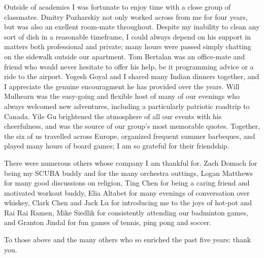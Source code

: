 Outside of academics I was fortunate to enjoy time with a close group of classmates. Dmitry Pozharskiy not only worked across from me for four years, but was also an exellent room-mate throughout. Despite my inability to clean any sort of dish in a reasonable timeframe, I could always depend on his support in matters both professional and private; many hours were passed simply chatting on the sidewalk outside our apartment. Tom Bertalan was an office-mate and friend who would never hesitate to offer his help, be it programming advice or a ride to the airport. Yogesh Goyal and I shared many Indian dinners together, and I appreciate the genuine encouragment he has provided over the years. Will Mulhearn was the easy-going and flexible host of many of our evenings who always welcomed new adventures, including a particularly patriotic roadtrip to Canada. Yile Gu brightened the atmosphere of all our events with his cheerfulness, and was the source of our group's most memorable quotes. Together, the six of us travelled across Europe, organized frequent summer barbeques, and played many hours of board games; I am so grateful for their friendship.

There were numerous others whose company I am thankful for. Zach Domach for being my SCUBA buddy and for the many orchestra outtings, Logan Matthews for many good discussions on religion, Ting Chen for being a caring friend and motivated workout buddy, Elia Altabet for many evenings of conversation over whiskey, Clark Chen and Jack Lu for introducing me to the joys of hot-pot and Rai Rai Ramen, Mike Siedlik for consistently attending our badminton games, and Granton Jindal for fun games of tennis, ping pong and soccer.

To those above and the many others who so enriched the past five years: thank you.